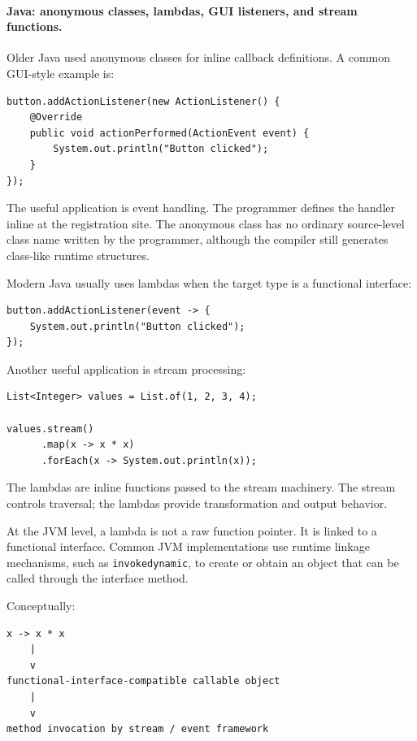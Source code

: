 \documentclass[a4paper,twoside]{report}
\begin{document}
\paragraph{Java: anonymous classes, lambdas, GUI listeners, and stream functions.}

Older Java used anonymous classes for inline callback definitions. A common GUI-style example is:

\begin{verbatim}
button.addActionListener(new ActionListener() {
    @Override
    public void actionPerformed(ActionEvent event) {
        System.out.println("Button clicked");
    }
});
\end{verbatim}

The useful application is event handling. The programmer defines the handler inline at the registration site. The anonymous class has no ordinary source-level class name written by the programmer, although the compiler still generates class-like runtime structures.

Modern Java usually uses lambdas when the target type is a functional interface:

\begin{verbatim}
button.addActionListener(event -> {
    System.out.println("Button clicked");
});
\end{verbatim}

Another useful application is stream processing:

\begin{verbatim}
List<Integer> values = List.of(1, 2, 3, 4);

values.stream()
      .map(x -> x * x)
      .forEach(x -> System.out.println(x));
\end{verbatim}

The lambdas are inline functions passed to the stream machinery. The stream controls traversal; the lambdas provide transformation and output behavior.

At the JVM level, a lambda is not a raw function pointer. It is linked to a functional interface. Common JVM implementations use runtime linkage mechanisms, such as \texttt{invokedynamic}, to create or obtain an object that can be called through the interface method.

Conceptually:

\begin{verbatim}
x -> x * x
    |
    v
functional-interface-compatible callable object
    |
    v
method invocation by stream / event framework
\end{verbatim}
\end{document}
